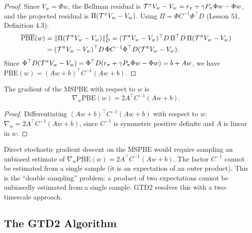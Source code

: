 \documentclass[11pt,a4paper]{article}
\begin{document}
\begin{proof}
Since $V_w = \Phi w$, the Bellman residual is
$\mathcal{T}^\pi V_w - V_w = r_\pi + \gamma P_\pi \Phi w
- \Phi w$, and the projected residual is
$\Pi(\mathcal{T}^\pi V_w - V_w)$. Using
$\Pi = \Phi C^{-1}\Phi^\top D$ (Lesson 51, Definition 4.3):
\begin{align}
  \overline{\mathrm{PBE}}(w)
  &= \|\Pi(\mathcal{T}^\pi V_w - V_w)\|_D^2
  = (\mathcal{T}^\pi V_w - V_w)^\top D\,\Pi^\top D\,\Pi
    (\mathcal{T}^\pi V_w - V_w) \nonumber\\
  &= (\mathcal{T}^\pi V_w - V_w)^\top D\,\Phi C^{-1}\Phi^\top D
    (\mathcal{T}^\pi V_w - V_w).
  \label{eq:mspbe_expand}
\end{align}
Since $\Phi^\top D(\mathcal{T}^\pi V_w - V_w)
= \Phi^\top D(r_\pi + \gamma P_\pi \Phi w - \Phi w)
= b + Aw$, we have
$\overline{\mathrm{PBE}}(w) = (Aw+b)^\top C^{-1}(Aw+b)$.
\end{proof}

\begin{lemma}
\label{lem:mspbe_gradient}
The gradient of the MSPBE with respect to $w$ is
\begin{equation}
  \nabla_w \overline{\mathrm{PBE}}(w) = 2A^\top C^{-1}(Aw + b).
  \label{eq:mspbe_gradient}
\end{equation}
\end{lemma}

\begin{proof}
Differentiating $(Aw+b)^\top C^{-1}(Aw+b)$ with respect to $w$:
$\nabla_w = 2A^\top C^{-1}(Aw+b)$, since $C^{-1}$ is symmetric
positive definite and $A$ is linear in $w$.
\end{proof}

\begin{remark}
\label{rem:c_inverse}
Direct stochastic gradient descent on the MSPBE would require
sampling an unbiased estimate of $\nabla_w \overline{\mathrm{PBE}}(w)
= 2A^\top C^{-1}(Aw+b)$. The factor $C^{-1}$ cannot be estimated
from a single sample (it is an expectation of an outer product).
This is the ``double sampling'' problem: a product of two
expectations cannot be unbiasedly estimated from a single sample.
GTD2 resolves this with a two-timescale approach.
\end{remark}

\subsection{The GTD2 Algorithm}
\label{subsec:gtd2}
\end{document}
